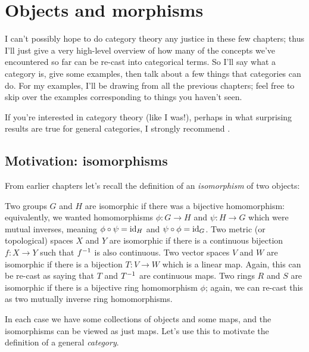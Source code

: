\chapter{Objects and morphisms}
\label{ch:cats}
I can't possibly hope to do category theory any justice in these few chapters;
thus I'll just give a very high-level overview of how many of the concepts we've
encountered so far can be re-cast into categorical terms.
So I'll say what a category is, give some examples,
then talk about a few things that categories can do.
For my examples, I'll be drawing from all the previous chapters;
feel free to skip over the examples corresponding to things you haven't seen.

If you're interested in category theory (like I was!), perhaps in
what surprising results are true for general categories, I strongly recommend \cite{ref:msci}.

\section{Motivation: isomorphisms}
From earlier chapters let's recall the definition of an \emph{isomorphism} of two objects:
\begin{itemize}
	\ii Two groups $G$ and $H$ are isomorphic if there was a bijective homomorphism:
	equivalently, we wanted homomorphisms $\phi : G \to H$ and $\psi : H \to G$
	which were mutual inverses, meaning $\phi \circ \psi = \mathrm{id}_H$ and $\psi \circ \phi = \mathrm{id}_G$.
	\ii Two metric (or topological) spaces $X$ and $Y$ are isomorphic
	if there is a continuous bijection $f : X \to Y$ such that $f^{-1}$ is also continuous.
	\ii Two vector spaces $V$ and $W$ are isomorphic if there is a bijection $T : V \to W$
	which is a linear map.
	Again, this can be re-cast as saying that $T$ and $T^{-1}$ are continuous maps.
	\ii Two rings $R$ and $S$ are isomorphic if there is a bijective ring homomorphism $\phi$;
	again, we can re-cast this as two mutually inverse ring homomorphisms.
\end{itemize}

In each case we have some collections of objects and some maps,
and the isomorphisms can be viewed as just maps.
Let's use this to motivate the definition of a general \emph{category}.

